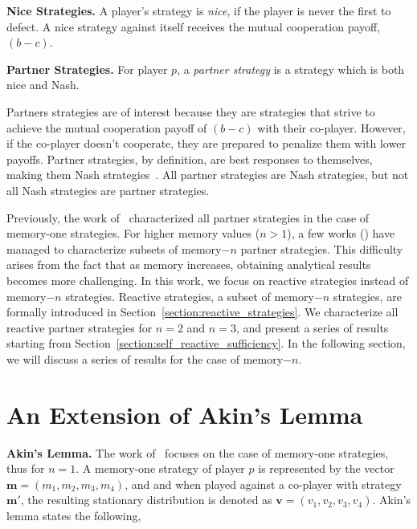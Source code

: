\documentclass{article}
\theoremstyle{definition}
\begin{document}
{\bf Nice Strategies.} A player's strategy is \textit{nice}, if the player is
never the first to defect. A nice strategy against itself receives the
mutual cooperation payoff, $(b - c)$.

{\bf Partner Strategies.} For player $p$, a \textit{partner strategy} is a strategy
which is both nice and Nash.

Partners strategies are of interest because they are strategies that strive to
achieve the mutual cooperation payoff of $(b - c)$ with their co-player.
However, if the co-player doesn't cooperate, they are prepared to penalize them
with lower payoffs. Partner strategies, by definition, are best responses to
themselves, making them Nash strategies~\citep{Hilbe:GEB:2015}. All partner
strategies are Nash strategies, but not all Nash strategies are partner
strategies.

Previously, the work of~\citep{akin:EGADS:2016} characterized all partner strategies in the
case of memory-one strategies. For higher memory values ($n > 1$), a few works
(\citep{hilbe:PNAS:2017}) have managed to characterize subsets of memory$-n$ partner
strategies. This difficulty arises from the fact that as memory increases,
obtaining analytical results becomes more challenging. In this work, we focus on
reactive strategies instead of memory$-n$ strategies. Reactive strategies, a
subset of memory$-n$ strategies, are formally introduced in Section~\ref{section:reactive_strategies}. We
characterize all reactive partner strategies for $n = 2$ and $n = 3$, and present a
series of results starting from Section~\ref{section:self_reactive_sufficiency}. In the following section, we will
discuss a series of results for the case of memory$-n$.

\section{An Extension of Akin's Lemma}

\textbf{Akin's Lemma.} The work of~\citep{akin:EGADS:2016} focuses on the case of
memory-one strategies, thus for $n=1$. A memory-one strategy of player $p$ is
represented by the vector $\mathbf{m} = (m_1, m_2, m_3, m_4)$, and and when
played against a co-player with strategy $\mathbf{m}'$, the resulting stationary
distribution is denoted as $\mathbf{v} = (v_1, v_2, v_3, v_4)$. Akin's lemma
states the following,
\end{document}
